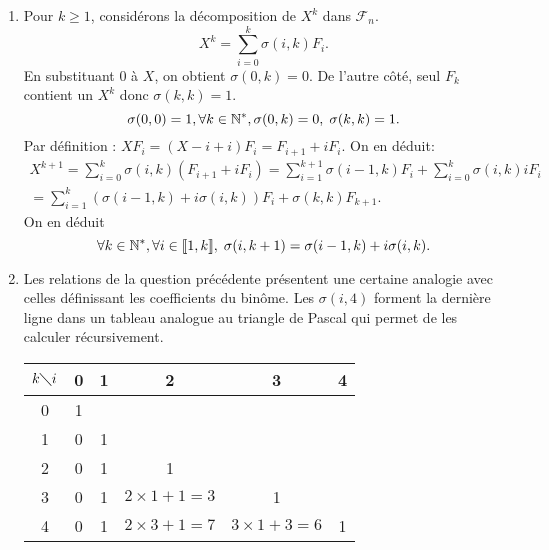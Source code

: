 \begin{enumerate}
\begin{enumerate}
  \item Pour $k\geq 1$, considérons la décomposition de $X^k$ dans $\mathcal{F}_n$. 
\[
 X^k = \sum_{i=0}^{k}\sigma(i,k)F_i.
\]
  En substituant $0$ à $X$, on obtient $\sigma(0,k)=0$. De l'autre côté, seul $F_k$ contient un $X^k$ donc $\sigma(k,k)=1$.
  \[
   \sigma(0,0) = 1, \forall k \in \mathbb{N}^*, \sigma(0,k) = 0, \; \sigma(k,k) = 1.
  \]
Par définition : $XF_i = (X-i +i)F_i = F_{i+1} + iF_i$. On en déduit:
\begin{multline*}
 X^{k+1} = \sum_{i=0}^{k}\sigma(i,k)(F_{i+1} + iF_i)
 = \sum_{i=1}^{k+1}\sigma(i-1,k)F_i + \sum_{i=0}^{k}\sigma(i,k)iF_i\\
 = \sum_{i=1}^{k}\left( \sigma(i-1,k) + i \sigma(i,k)\right) F_i + \sigma(k,k)F_{k+1}.
\end{multline*}
On en déduit
\[
 \forall k \in \mathbb{N}^*, \forall i \in \llbracket 1,k \rrbracket, \; \sigma(i,k+1) = \sigma(i-1,k) + i\sigma(i,k).
\]

  \item Les relations de la question précédente présentent une certaine analogie avec celles définissant les coefficients du binôme. Les $\sigma(i,4)$ forment la dernière ligne dans un tableau analogue au triangle de Pascal qui permet de les calculer récursivement.
\begin{center}
\renewcommand{\arraystretch}{1.5}
\vspace{0.2cm}
\begin{tabular}{|c|c|c|c|c|c|}\hline
$k\diagdown i$ & 0 & 1 & 2                   & 3 & 4 \\ \hline
0              & 1 &   &                     &   &    \\ \hline
1              & 0 & 1 &                     &   &    \\ \hline
2              & 0 & 1 & 1                   &   &   \\ \hline
3              & 0 & 1 & $2\times 1 + 1 = 3$ & 1 &   \\ \hline
4              & 0 & 1 & $2\times 3 + 1 = 7$ & $3\times 1 + 3 = 6$  & 1 \\ \hline
\end{tabular}
\end{center}

 \end{enumerate}


\end{enumerate}
